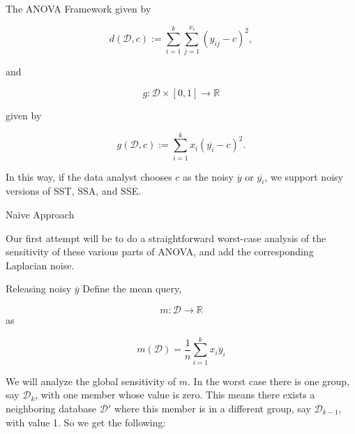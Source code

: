 \documentclass[11pt]{article}
\begin{document}
\begin{section}{The ANOVA Framework}
given by

\[
d(\mathcal{D},c) := \sum_{i=1}^k \sum_{j=1}^{x_i} (y_{ij} - c)^2,
\]

and 

\[
g:\mathcal{D}\times [0,1]\to\mathbb{R}
\]

given by

\[
g(\mathcal{D},c) := \sum_{i=1}^k x_i (\overline{y_i} - c)^2.
\]

In this way, if the data analyst chooses $c$ as the noisy $\overline{y}$ or 
$\overline{y_i}$, we support noisy versions of SST, SSA, and SSE.

\end{section}

\begin{section}{Naive Approach}

Our first attempt will be to do a straightforward worst-case analysis of 
the sensitivity of these various parts of ANOVA, and add the corresponding 
Laplacian noise. 

\begin{subsection}{Releasing noisy $\overline{y}$}
Define the mean query,

\[
m:\mathcal{D}\to\mathbb{R}
\]
as 

\[
m(\mathcal{D}) = \frac{1}{n} \sum_{i=1}^{k} x_i \overline{y}_i
\]

We will analyze the global sensitivity of $m$. In the worst 
case there is one group, say $\mathcal{D}_k$, with one member whose 
value is zero. This means there exists a neighboring database $\mathcal{D}'$ 
where this member is in a different group, say $\mathcal{D}_{k-1}$, with 
value 1. So we get the following:


\end{subsection}
\end{section}
\end{document}
